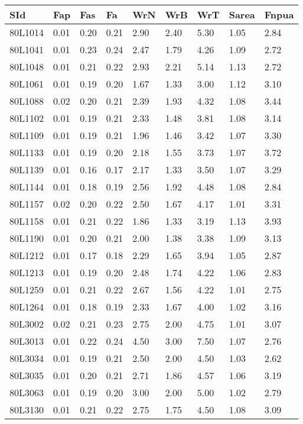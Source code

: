 \begin{center}
\begin{longtable}{|p{0.6in}|p{0.5in}|p{0.5in}|p{0.5in}|p{0.5in}|p{0.5in}|p{0.5in}|p{0.5in}|p{0.5in}|}
  SId & Fap & Fas & Fa & WrN & WrB & WrT & Sarea & Fnpua \\ 
  \hline
 80L1014 & 0.01 & 0.20 & 0.21 & 2.90 & 2.40 & 5.30 & 1.05 & 2.84 \\ 
 80L1041 & 0.01 & 0.23 & 0.24 & 2.47 & 1.79 & 4.26 & 1.09 & 2.72 \\ 
 80L1048 & 0.01 & 0.21 & 0.22 & 2.93 & 2.21 & 5.14 & 1.13 & 2.72 \\ 
 80L1061 & 0.01 & 0.19 & 0.20 & 1.67 & 1.33 & 3.00 & 1.12 & 3.10 \\ 
 80L1088 & 0.02 & 0.20 & 0.21 & 2.39 & 1.93 & 4.32 & 1.08 & 3.44 \\ 
 80L1102 & 0.01 & 0.19 & 0.21 & 2.33 & 1.48 & 3.81 & 1.08 & 3.14 \\ 
 80L1109 & 0.01 & 0.19 & 0.21 & 1.96 & 1.46 & 3.42 & 1.07 & 3.30 \\ 
 80L1133 & 0.01 & 0.19 & 0.20 & 2.18 & 1.55 & 3.73 & 1.07 & 3.72 \\ 
 80L1139 & 0.01 & 0.16 & 0.17 & 2.17 & 1.33 & 3.50 & 1.07 & 3.29 \\ 
 80L1144 & 0.01 & 0.18 & 0.19 & 2.56 & 1.92 & 4.48 & 1.08 & 2.84 \\ 
 80L1157 & 0.02 & 0.20 & 0.22 & 2.50 & 1.67 & 4.17 & 1.01 & 3.31 \\ 
 80L1158 & 0.01 & 0.21 & 0.22 & 1.86 & 1.33 & 3.19 & 1.13 & 3.93 \\ 
 80L1190 & 0.01 & 0.20 & 0.21 & 2.00 & 1.38 & 3.38 & 1.09 & 3.13 \\ 
 80L1212 & 0.01 & 0.17 & 0.18 & 2.29 & 1.65 & 3.94 & 1.05 & 2.87 \\ 
 80L1213 & 0.01 & 0.19 & 0.20 & 2.48 & 1.74 & 4.22 & 1.06 & 2.83 \\ 
 80L1259 & 0.01 & 0.21 & 0.22 & 2.67 & 1.56 & 4.22 & 1.01 & 2.75 \\ 
 80L1264 & 0.01 & 0.18 & 0.19 & 2.33 & 1.67 & 4.00 & 1.02 & 3.16 \\ 
 80L3002 & 0.02 & 0.21 & 0.23 & 2.75 & 2.00 & 4.75 & 1.01 & 3.07 \\ 
 80L3013 & 0.01 & 0.22 & 0.24 & 4.50 & 3.00 & 7.50 & 1.07 & 2.76 \\ 
 80L3034 & 0.01 & 0.19 & 0.21 & 2.50 & 2.00 & 4.50 & 1.03 & 2.62 \\ 
 80L3035 & 0.01 & 0.20 & 0.21 & 2.71 & 1.86 & 4.57 & 1.06 & 3.19 \\ 
 80L3063 & 0.01 & 0.19 & 0.20 & 3.00 & 2.00 & 5.00 & 1.02 & 2.79 \\ 
 80L3130 & 0.01 & 0.21 & 0.22 & 2.75 & 1.75 & 4.50 & 1.08 & 3.09 \\ 

\end{longtable}
\end{center}

